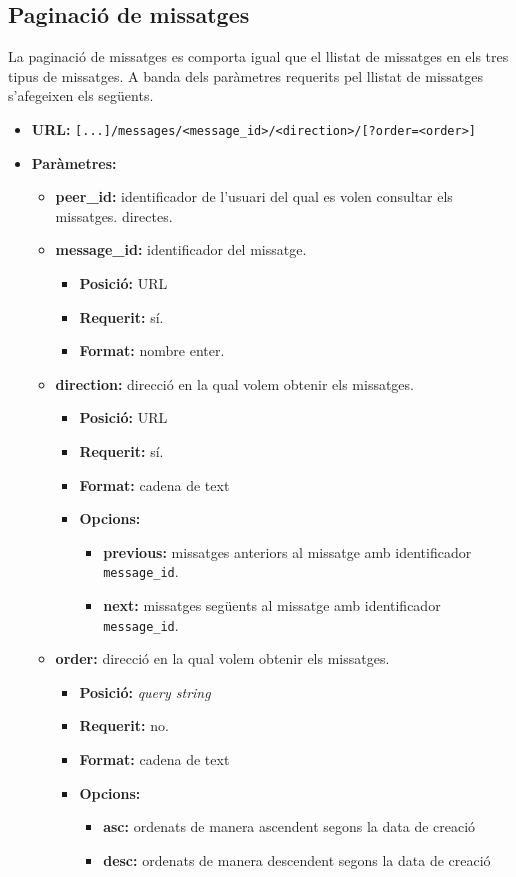 	
\subsection{Paginació de missatges}
La paginació de missatges es comporta igual que el llistat de missatges en els tres tipus de missatges. A banda dels paràmetres requerits pel llistat de missatges s'afegeixen els següents.
\begin{itemize}
\item \textbf{\ac{URL}:} \verb$[...]/messages/<message_id>/<direction>/[?order=<order>]$
\item \textbf{Paràmetres:}
	\begin{itemize}
		\item \textbf{peer\_id:} identificador de l'usuari del qual es volen consultar els missatges. directes.
		\item \textbf{message\_id:} identificador del missatge.
		\begin{itemize}
			\item \textbf{Posició:} \ac{URL}
			\item \textbf{Requerit:} sí.
			\item \textbf{Format:} nombre enter.
		\end{itemize}
		\item \textbf{direction:} direcció en la qual volem obtenir els missatges.
		\begin{itemize}
			\item \textbf{Posició:} \ac{URL}
			\item \textbf{Requerit:} sí.
			\item \textbf{Format:} cadena de text
			\item \textbf{Opcions:}
				\begin{itemize}
					\item \textbf{previous:} missatges anteriors al missatge amb identificador \texttt{message\_id}.
					\item \textbf{next:} missatges següents al missatge amb identificador \texttt{message\_id}.
				\end{itemize}
				

		\end{itemize}
		\item \textbf{order:} direcció en la qual volem obtenir els missatges.
		\begin{itemize}
			\item \textbf{Posició:} \emph{query string}
			\item \textbf{Requerit:} no.
			\item \textbf{Format:} cadena de text
			\item \textbf{Opcions:}
				\begin{itemize}
					\item \textbf{asc:} ordenats de manera ascendent segons la data de creació
					\item \textbf{desc:} ordenats de manera descendent segons la data de creació
				\end{itemize}
		\end{itemize}
	\end{itemize}
\end{itemize}


